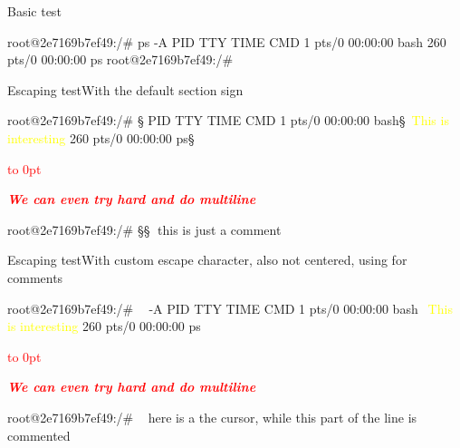 \newtoks\nicsroot{}

\endofdump





\begin{slide}{Basic test}{}
  \begin{nicscolumn}
    \begin{nicsterm}
      root@2e7169b7ef49:/# ps -A
        PID TTY          TIME CMD
          1 pts/0    00:00:00 bash
        260 pts/0    00:00:00 ps
      root@2e7169b7ef49:/#
    \end{nicsterm}
  \end{nicscolumn}
\end{slide}

\begin{slide}{Escaping test}{With the default section sign}
  \begin{nicscolumn}
    \begin{nicsterm}
      root@2e7169b7ef49:/# §
        PID TTY          TIME CMD
          1 pts/0    00:00:00 bash§~\textcolor{yellow}{\leftarrow\textrm{This is interesting}}
        260 pts/0    00:00:00 ps§~~~\textcolor{red}   {\leftarrow\vtop to 0pt{\hsize=4cm \fontsize{9}{10}\selectfont \sffamily \noindent \raggedright \textsl{\textbf{We can even try hard and do multiline}}\vss}}
      root@2e7169b7ef49:/# §\nicstermcursor§ this is just a comment
    \end{nicsterm}
  \end{nicscolumn}
\end{slide}

\begin{slide}{Escaping test}{With custom escape character, also not centered, using  for comments}
  \begin{nicscolumn}
    \begin{nicsterm}
      root@2e7169b7ef49:/#  -A
        PID TTY          TIME CMD
          1 pts/0    00:00:00 bash~\textcolor{yellow}{\leftarrow\textrm{This is interesting}}
        260 pts/0    00:00:00 ps~~~\textcolor{red}   {\leftarrow\vtop to 0pt{\hsize=4cm \fontsize{9}{10}\selectfont \sffamily \noindent \raggedright \textsl{\textbf{We can even try hard and do multiline}}\vss}}
      root@2e7169b7ef49:/# \nicstermcursorhere is a the cursor, while this part of the line is commented
    \end{nicsterm}
  \end{nicscolumn}
\end{slide}

